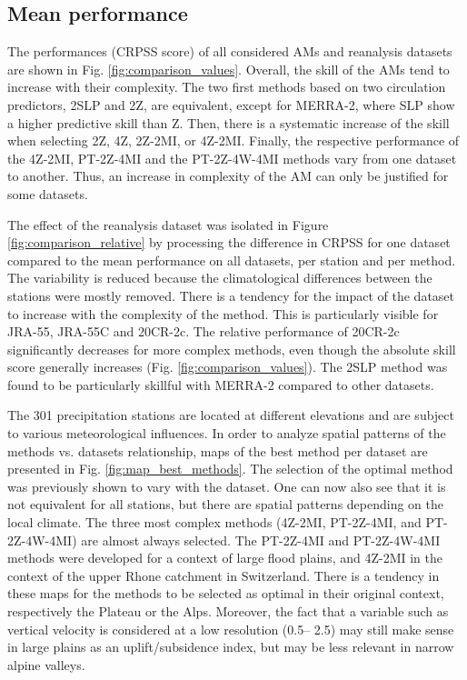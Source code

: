 \documentclass{ametsoc}
\begin{document}
\subsection{Mean performance}

The performances (CRPSS score) of all considered AMs and reanalysis datasets are shown in Fig. \ref{fig:comparison_values}. Overall, the skill of the AMs tend to increase with their complexity. The two first methods based on two circulation predictors, 2SLP and 2Z, are equivalent, except for MERRA-2, where SLP show a higher predictive skill than Z. Then, there is a systematic increase of the skill when selecting 2Z, 4Z, 2Z-2MI, or 4Z-2MI. Finally, the respective performance of the 4Z-2MI, PT-2Z-4MI and the PT-2Z-4W-4MI methods vary from one dataset to another. Thus, an increase in complexity of the AM can only be justified for some datasets.

The effect of the reanalysis dataset was isolated in Figure \ref{fig:comparison_relative} by processing the difference in CRPSS for one dataset compared to the mean performance on all datasets, per station and per method. The variability is reduced because the climatological differences between the stations were mostly removed. There is a tendency for the impact of the dataset to increase with the complexity of the method. This is particularly visible for JRA-55, JRA-55C and 20CR-2c. The relative performance of 20CR-2c significantly decreases for more complex methods, even though the absolute skill score generally increases (Fig. \ref{fig:comparison_values}). The 2SLP method was found to be particularly skillful with MERRA-2 compared to other datasets. 

The 301 precipitation stations are located at different elevations and are subject to various meteorological influences. In order to analyze spatial patterns of the methods vs. datasets relationship, maps of the best method per dataset are presented in Fig. \ref{fig:map_best_methods}. The selection of the optimal method was previously shown to vary with the dataset. One can now also see that it is not equivalent for all stations, but there are spatial patterns depending on the local climate. The three most complex methods (4Z-2MI, PT-2Z-4MI, and PT-2Z-4W-4MI) are almost always selected. The PT-2Z-4MI and PT-2Z-4W-4MI methods were developed for a context of large flood plains, and 4Z-2MI in the context of the upper Rhone catchment in Switzerland. There is a tendency in these maps for the methods to be selected as optimal in their original context, respectively the Plateau or the Alps. Moreover, the fact that a variable such as vertical velocity is considered at a low resolution (0.5\degree -- 2.5\degree) may still make sense in large plains as an uplift/subsidence index, but may be less relevant in narrow alpine valleys. 
\end{document}
